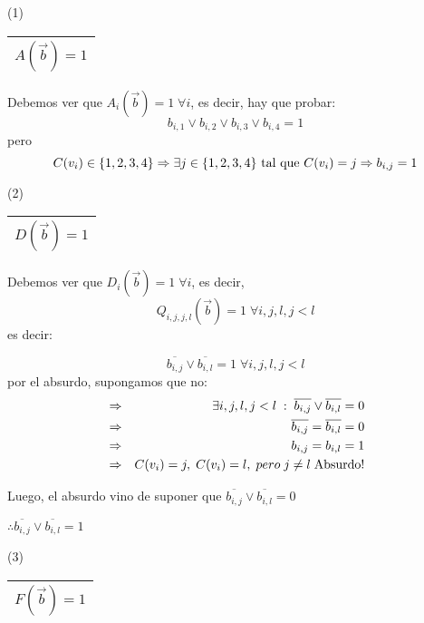 \documentclass[12pt,a4paper]{report}
\newcounter{neq}
\begin{document}
				\vspace{3mm}
				(1) \begin{tabular}{|c|} \hline $A(\overrightarrow{b}) = 1$ \\ \hline \end{tabular}
					\par Debemos ver que $A_{i}(\overrightarrow{b}) = 1 \; \forall i$, es decir, hay que probar:
					\[ b_{i, 1} \vee b_{i, 2} \vee b_{i, 3} \vee b_{i, 4} = 1 \]
					pero
					\[ C(v_{i}) \in \lbrace 1, 2, 3, 4 \rbrace \Rightarrow \exists j \in \lbrace 1, 2, 3, 4 \rbrace \textup{ tal que } C(v_{i}) = j \Rightarrow b_{i, j} = 1\]

				\vspace{3mm}
				(2) \begin{tabular}{|c|} \hline $D(\overrightarrow{b}) = 1$ \\ \hline \end{tabular}
					\par Debemos ver que $D_{i}(\overrightarrow{b}) = 1 \; \forall i$, es decir,
					\[ Q_{i, j, j, l}(\overrightarrow{b}) = 1 \; \forall i, j, l,  j < l \] es decir:

					\[ \overline{b_{i, j}} \vee \overline{b_{i, l}} = 1 \; \forall i, j, l, j <  l\]
					por el absurdo, supongamos que no:
					\begin{eqnarray}
						\nonumber &\Rightarrow & \exists i, j, l, j < l \; : \; \overline{b_{i, j}} \vee \overline{b_{i, l}} = 0 \\
						\nonumber &\Rightarrow & \overline{b_{i, j}} = \overline{b_{i, l}} = 0 \\
						\nonumber &\Rightarrow & b_{i, j} = b_{i, l} = 1 \\
						\nonumber &\Rightarrow & C(v_{i}) = j, \; C(v_{i}) = l, \; pero \; j \neq l \; \textup{Absurdo!}
					\end{eqnarray}
					\par Luego, el absurdo vino de suponer que $\overline{b_{i, j}} \vee \overline{b_{i, l}} = 0$

					\vspace{3mm}
					$\therefore \overline{b_{i, j}} \vee \overline{b_{i, l}} = 1$

				\vspace{3mm}
				(3) \begin{tabular}{|c|} \hline $F(\overrightarrow{b}) = 1$ \\ \hline \end{tabular}
				\vspace{3mm}
\end{document}
